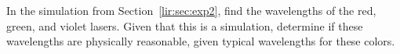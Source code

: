 In the simulation from Section\ \ref{lir:sec:exp2}, find the wavelengths of the red, green, and violet lasers. Given that this is a simulation, determine if these wavelengths are physically reasonable, given typical wavelengths for these colors.

%
%
